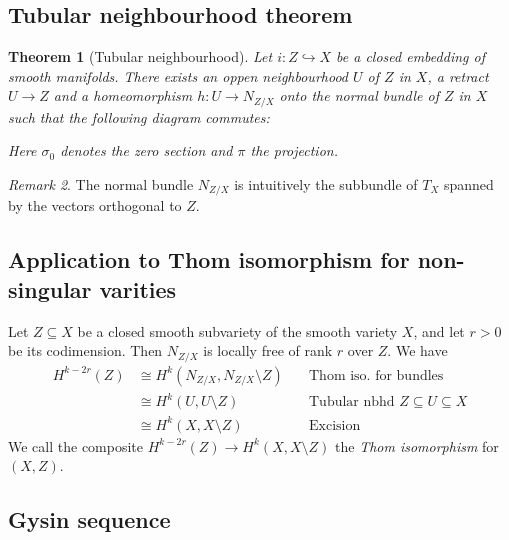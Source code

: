 \documentclass[A4paper, british]{amsart}
\theoremstyle{darkgreentheorem}
\newtheorem{thm}{Theorem}[section]
\theoremstyle{darkbluedefinition}
\theoremstyle{darkredexample}
\theoremstyle{remark}
\newtheorem{rem}[thm]{Remark}
\newcommand{\1}{\mathbbm{1}}
\newcommand{\sub}{\subseteq}
\newcommand{\mono}{\hookrightarrow}
\begin{document}
\subsection{Tubular neighbourhood theorem}

\begin{thm}[Tubular neighbourhood]
    Let $i\colon Z\mono X$ be a closed embedding of smooth manifolds.
    There exists an oppen neighbourhood $U$ of $Z$ in $X$, a retract $U\to Z$ and a homeomorphism $h\colon U\to N_{Z/X}$ onto the normal bundle of $Z$ in $X$ such that the following diagram commutes:
    \begin{center}
    \end{center}
    Here $\sigma_{0}$ denotes the zero section and $\pi$ the projection.
\end{thm}

\begin{rem}
    The normal bundle $N_{Z/X}$ is intuitively the subbundle of $T_{X}$ spanned by the vectors orthogonal to $Z$.
\end{rem}

\subsection{Application to Thom isomorphism for non-singular varities}

Let $Z\sub X$ be a closed smooth subvariety of the smooth variety $X$, and let $r>0$ be its codimension.
Then $N_{Z/X}$ is locally free of rank $r$ over $Z$.
We have
\begin{align*}
    H^{k-2r}(Z) & \cong H^{k}(N_{Z/X},N_{Z/X}\setminus Z) & \quad \text{Thom iso. for bundles} \\
    & \cong H^{k}(U,U\setminus Z) & \quad \text{Tubular nbhd } Z\sub U\sub X \\
    & \cong H^{k}(X,X\setminus Z) & \quad \text{Excision}
\end{align*}
We call the composite $H^{k-2r}(Z)\to H^{k}(X,X\setminus Z)$ the \textit{Thom isomorphism} for $(X,Z)$.

\subsection{Gysin sequence}
\end{document}
